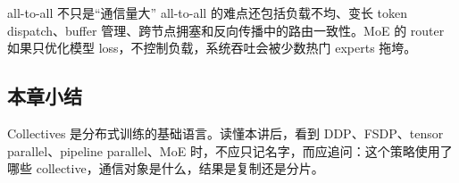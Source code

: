 \begin{warningbox}{all-to-all 不只是“通信量大”}
all-to-all 的难点还包括负载不均、变长 token dispatch、buffer 管理、跨节点拥塞和反向传播中的路由一致性。MoE 的 router 如果只优化模型 loss，不控制负载，系统吞吐会被少数热门 experts 拖垮。
\end{warningbox}

\subsection{本章小结}

Collectives 是分布式训练的基础语言。读懂本讲后，看到 DDP、FSDP、tensor parallel、pipeline parallel、MoE 时，不应只记名字，而应追问：这个策略使用了哪些 collective，通信对象是什么，结果是复制还是分片。

